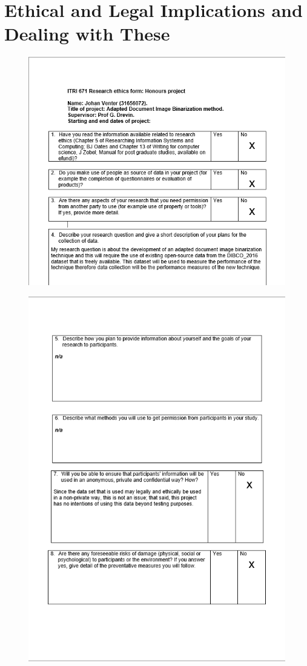 \documentclass[a4paper, 12pt]{report}
\begin{document}
\section{Ethical and Legal Implications and Dealing with These}
\begin{figure}[ht]
    \includegraphics[width=\linewidth]{ethics1.png}
    \label{fig:ethics1}
\end{figure}
\begin{figure}
    \includegraphics[width=\linewidth]{ethics2.png}
    \label{fig:ethics2}
\end{figure}
\end{document}
